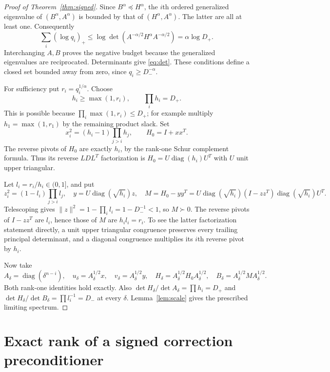 \documentclass[11pt]{article}
\newcommand{\diag}{\operatorname{diag}}
\newcommand{\norm}[1]{\lVert#1\rVert}
\begin{document}
\begin{proof}[Proof of Theorem~\ref{thm:signed}]
Since $B^\alpha\preceq H^\alpha$, the $i$th ordered generalized eigenvalue
of $(B^\alpha,A^\alpha)$ is bounded by that of $(H^\alpha,A^\alpha)$.
The latter are all at least one. Consequently
\[
 \sum_i(\log q_i)_+
 \le\log\det(A^{-\alpha/2}H^\alpha A^{-\alpha/2})
 =\alpha\log D_+.
\]
Interchanging $A,B$ proves the negative budget because the generalized
eigenvalues are reciprocated. Determinants give \eqref{eq:det}. These
conditions define a closed set bounded away from zero, since
$q_i\ge D_-^{-\alpha}$.

For sufficiency put $r_i=q_i^{1/\alpha}$. Choose
\[
 h_i\ge\max(1,r_i),\qquad \prod_i h_i=D_+.
\]
This is possible because $\prod_i\max(1,r_i)\le D_+$; for example
multiply $h_1=\max(1,r_1)$ by the remaining product slack. Set
\[
 x_i^2=(h_i-1)\prod_{j>i}h_j,\qquad H_0=I+xx^T.
\]
The reverse pivots of $H_0$ are exactly $h_i$, by the rank-one Schur
complement formula. Thus its reverse $LDL^T$ factorization is
$H_0=U\diag(h_i)U^T$ with $U$ unit upper triangular.

Let $l_i=r_i/h_i\in(0,1]$, and put
\[
 z_i^2=(1-l_i)\prod_{j>i}l_j,\quad
 y=U\diag(\sqrt{h_i})z,\quad
 M=H_0-yy^T
   =U\diag(\sqrt{h_i})(I-zz^T)\diag(\sqrt{h_i})U^T.
\]
Telescoping gives $\norm z^2=1-\prod_i l_i=1-D_-^{-1}<1$, so
$M\succ0$. The reverse pivots of $I-zz^T$ are $l_i$, hence those of
$M$ are $h_i l_i=r_i$. To see the latter factorization statement
directly, a unit upper triangular congruence preserves every trailing
principal determinant, and a diagonal congruence multiplies its $i$th
reverse pivot by $h_i$.

Now take
\[
 A_\delta=\diag(\delta^{n-i}),\quad
 u_\delta=A_\delta^{1/2}x,\quad
 v_\delta=A_\delta^{1/2}y,\quad
 H_\delta=A_\delta^{1/2}H_0A_\delta^{1/2},\quad
 B_\delta=A_\delta^{1/2}MA_\delta^{1/2}.
\]
Both rank-one identities hold exactly. Also
$\det H_\delta/\det A_\delta=\prod h_i=D_+$ and
$\det H_\delta/\det B_\delta=\prod l_i^{-1}=D_-$ at every
$\delta$. Lemma~\ref{lem:scale} gives the prescribed limiting spectrum.
\end{proof}

\section{Exact rank of a signed correction preconditioner}
\end{document}
